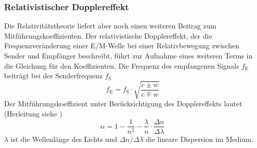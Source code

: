 \subsubsection*{Relativistischer Dopplereffekt}
Die Relativitätstheorie liefert aber noch einen weiteren Beitrag zum Mitführungskoeffizienten.
Der relativistische Dopplereffekt, der die Frequenzveränderung einer E/M-Welle
bei einer Relativbewegung zwischen Sender und Empfänger beschreibt,
führt zur Aufnahme eines weiteren Terms in die Gleichung für den Koeffizienten.
Die Frequenz des empfangenen Signals $f_\text{E}$ beiträgt bei der Senderfrequenz $f_\text{S}$
\begin{equation}
\label{}
f_\text{E} = f_\text{S} \cdot \sqrt{\frac{c \pm w}{c \mp w}}
\end{equation}
Der Mitführungskoeffizient unter Berücksichtigung des Dopplereffekts lautet (Herleitung siehe \cite{staatsex})
\begin{equation}
\label{eq:alpha:theo}
\alpha = 1 - \frac{1}{n^2} - \frac{\lambda}{n} \cdot \frac{\Delta n}{\Delta \lambda}
\end{equation}
$\lambda$ ist die Wellenlänge des Lichts und $\Delta n / \Delta \lambda$ die lineare Dispersion im Medium.

